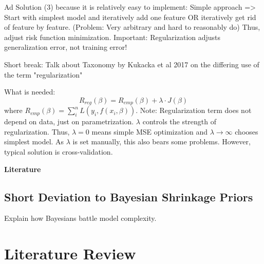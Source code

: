 \documentclass[12pt,a4paper]{article}
\newenvironment{lightbluebox}{%
    \begin{tcolorbox}[colback=lightblue, colframe=lightblue, fontupper=\itshape]%
}{%
    \end{tcolorbox}%
}
\begin{document}
\begin{lightbluebox}
Ad Solution (3) because it is relatively easy to implement: Simple approach => Start with simplest model and iteratively add one feature OR iteratively get rid of feature by feature. (Problem: Very arbitrary and hard to reasonably do) Thus, adjust risk function minimization. Important: Regularization adjusts generalization error, not training error!

Short break: Talk about Taxonomy by Kukacka et al 2017 on the differing use of the term "regularization" 

What is needed: 
\[
R_{reg}(\beta) = R_{emp}(\beta)+ \lambda \cdot J(\beta)
\]
where $R_{emp}(\beta) = \sum_i^n L(y_i, f(x_i, \beta))$. Note: Regularization term does not depend on data, just on parametrization. $\lambda$ controls the strength of regularization. Thus, $\lambda = 0$ means simple MSE optimization and $\lambda \to \infty$ chooses simplest model. As $\lambda$ is set manually, this also bears some problems. However, typical solution is cross-validation. 

\textbf{Literature}
\parencite{Taxonomy2017}
\end{lightbluebox}

\subsection{Short Deviation to Bayesian Shrinkage Priors}
Explain how Bayesians battle model complexity. 

\newpage

\section{Literature Review}\label{sec:litreview}
\end{document}
